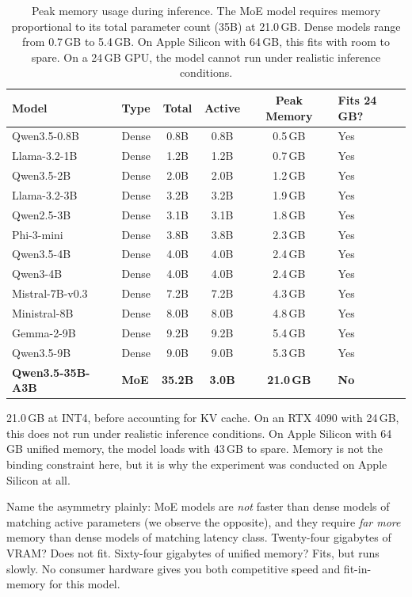 \documentclass[11pt]{article}
\begin{document}
\begin{table}[t]
\centering
\caption{Peak memory usage during inference.  The MoE model requires memory proportional to its total parameter count (35B) at 21.0\,GB.  Dense models range from 0.7\,GB to 5.4\,GB.  On Apple Silicon with 64\,GB, this fits with room to spare.  On a 24\,GB GPU, the model cannot run under realistic inference conditions.}
\label{tab:memory-profile}
\small
\begin{tabular}{llcccl}
\toprule
\textbf{Model} & \textbf{Type} & \textbf{Total} & \textbf{Active} & \textbf{Peak Memory} & \textbf{Fits 24\,GB?} \\
\midrule
Qwen3.5-0.8B & Dense & 0.8B & 0.8B & 0.5\,GB & Yes \\
Llama-3.2-1B & Dense & 1.2B & 1.2B & 0.7\,GB & Yes \\
Qwen3.5-2B & Dense & 2.0B & 2.0B & 1.2\,GB & Yes \\
Llama-3.2-3B & Dense & 3.2B & 3.2B & 1.9\,GB & Yes \\
Qwen2.5-3B & Dense & 3.1B & 3.1B & 1.8\,GB & Yes \\
Phi-3-mini & Dense & 3.8B & 3.8B & 2.3\,GB & Yes \\
Qwen3.5-4B & Dense & 4.0B & 4.0B & 2.4\,GB & Yes \\
Qwen3-4B & Dense & 4.0B & 4.0B & 2.4\,GB & Yes \\
Mistral-7B-v0.3 & Dense & 7.2B & 7.2B & 4.3\,GB & Yes \\
Ministral-8B & Dense & 8.0B & 8.0B & 4.8\,GB & Yes \\
Gemma-2-9B & Dense & 9.2B & 9.2B & 5.4\,GB & Yes \\
Qwen3.5-9B & Dense & 9.0B & 9.0B & 5.3\,GB & Yes \\
\midrule
\rowcolor{moepurple!8}
\textbf{Qwen3.5-35B-A3B} & \textbf{MoE} & \textbf{35.2B} & \textbf{3.0B} & \textbf{21.0\,GB} & \textbf{No} \\
\bottomrule
\end{tabular}
\end{table}

21.0\,GB at INT4, before accounting for KV cache.  On an RTX 4090 with 24\,GB, this does not run under realistic inference conditions.  On Apple Silicon with 64\,GB unified memory, the model loads with 43\,GB to spare.  Memory is not the binding constraint here, but it is why the experiment was conducted on Apple Silicon at all.

Name the asymmetry plainly: MoE models are \emph{not} faster than dense models of matching active parameters (we observe the opposite), and they require \emph{far more} memory than dense models of matching latency class.  Twenty-four gigabytes of VRAM? Does not fit.  Sixty-four gigabytes of unified memory? Fits, but runs slowly.  No consumer hardware gives you both competitive speed and fit-in-memory for this model.
\end{document}
